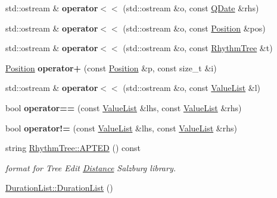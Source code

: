 \begin{DoxyCompactItemize}
std\+::ostream \& {\bfseries operator$<$$<$} (std\+::ostream \&o, const \mbox{\hyperlink{classQDate}{Q\+Date}} \&rhs)
\item 
\mbox{\label{group__output_ga352cef0201630bbd48cc2cd14ecbe5ab}} 
std\+::ostream \& {\bfseries operator$<$$<$} (std\+::ostream \&o, const \mbox{\hyperlink{classPosition}{Position}} \&pos)
\item 
\mbox{\label{group__output_gaccc3468661637ee13e14eb176997086f}} 
std\+::ostream \& {\bfseries operator$<$$<$} (std\+::ostream \&o, const \mbox{\hyperlink{classRhythmTree}{Rhythm\+Tree}} \&t)
\item 
\mbox{\label{group__output_gaa15fcbf280e167eab1fe03f9c0f5663c}} 
\mbox{\hyperlink{classPosition}{Position}} {\bfseries operator+} (const \mbox{\hyperlink{classPosition}{Position}} \&p, const size\+\_\+t \&i)
\item 
\mbox{\label{group__output_ga857c7d77fd72ff4aa331c2d7aa1ff9b2}} 
std\+::ostream \& {\bfseries operator$<$$<$} (std\+::ostream \&o, const \mbox{\hyperlink{classValueList}{Value\+List}} \&l)
\item 
\mbox{\label{group__output_gaca91eab87be1cd794334474670baa188}} 
bool {\bfseries operator==} (const \mbox{\hyperlink{classValueList}{Value\+List}} \&lhs, const \mbox{\hyperlink{classValueList}{Value\+List}} \&rhs)
\item 
\mbox{\label{group__output_gaad126050f09b6e61d8a4bda13c17ad8a}} 
bool {\bfseries operator!=} (const \mbox{\hyperlink{classValueList}{Value\+List}} \&lhs, const \mbox{\hyperlink{classValueList}{Value\+List}} \&rhs)
\item 
string \mbox{\hyperlink{group__output_ga2c194b384127267b8cfed2c41e70d338}{Rhythm\+Tree\+::\+A\+P\+T\+ED}} () const
\begin{DoxyCompactList}\small\item\em format for Tree Edit \mbox{\hyperlink{classDistance}{Distance}} Salzburg library. \end{DoxyCompactList}\item 
\mbox{\label{group__output_ga24f753a9aa9316fc7903e6f253b94944}} 
\mbox{\hyperlink{group__output_ga24f753a9aa9316fc7903e6f253b94944}{Duration\+List\+::\+Duration\+List}} ()

\end{DoxyCompactItemize}
